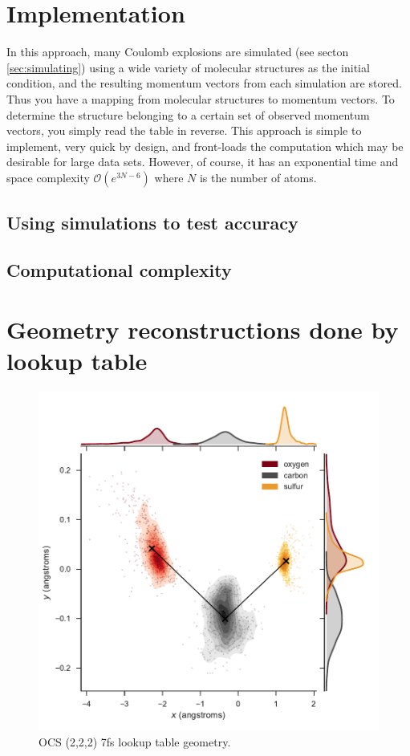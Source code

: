 \section{Implementation}
In this approach, many Coulomb explosions are simulated (see secton \ref{sec:simulating}) using a wide variety of molecular structures as the initial condition, and the resulting momentum vectors from each simulation are stored. Thus you have a mapping from molecular structures to momentum vectors. To determine the structure belonging to a certain set of observed momentum vectors, you simply read the table in reverse. This approach is simple to implement, very quick by design, and front-loads the computation which may be desirable for large data sets. However, of course, it has an exponential time and space complexity $\mathcal{O}(e^{3N-6})$ where $N$ is the number of atoms.

\subsection{Using simulations to test accuracy}
\subsection{Computational complexity}

\section{Geometry reconstructions done by lookup table}

\pagebreak
\begin{figure}
  \centering
  \includegraphics[width=\textwidth]{Plots/OCS2227fsLTGeometry}
  \caption[OCS (2,2,2) 7fs lookup table geometry.]
  {OCS (2,2,2) 7fs lookup table geometry.}
  \label{fig:OCS2227fsLTGeometry}
\end{figure}
\clearpage

